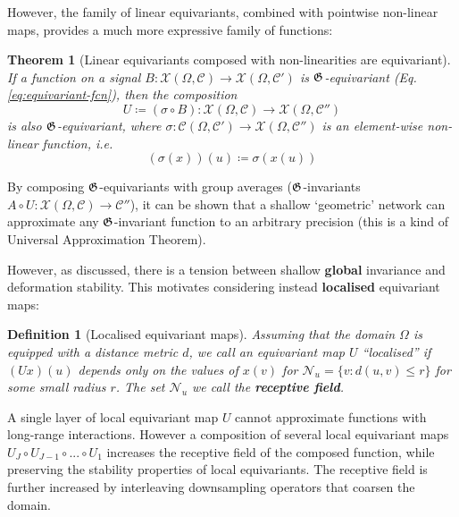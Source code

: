 \documentclass[11pt]{article}
\numberwithin{equation}{section}
\newcommand{\defeq}{\coloneqq}
\newtheorem{thm}{Theorem}[section]
\newtheorem{defn}{Definition}[section]
\begin{document}
However, the family of linear equivariants, combined with pointwise non-linear maps, provides a much more expressive family of functions:
\begin{thm}[Linear equivariants composed with non-linearities are equivariant]
If a function on a signal $B: \mathcal{X}(\Omega, \mathcal{C}) \rightarrow \mathcal{X}(\Omega, \mathcal{C}')$ is $\mathfrak{G}$-equivariant (Eq.\eqref{eq:equivariant-fcn}), then the composition 
\begin{equation}
U \defeq (\sigma \circ B): \mathcal{X}(\Omega, \mathcal{C}) \rightarrow \mathcal{X}(\Omega, \mathcal{C}'')
\end{equation}
is also $\mathfrak{G}$-equivariant, where $\sigma : \mathcal{C}(\Omega, \mathcal{C}') \rightarrow \mathcal{X}(\Omega, \mathcal{C}'')$ is an element-wise non-linear function, i.e. 
\begin{equation}
(\sigma(x))(u) \defeq \sigma(x(u))
\end{equation}
\end{thm}
By composing $\mathfrak{G}$-equivariants with group averages ($\mathfrak{G}$-invariants $A \circ U : \mathcal{X}(\Omega, \mathcal{C})\rightarrow \mathcal{C}''$), it can be shown that a shallow `geometric' network can approximate any $\mathfrak{G}$-invariant function to an arbitrary precision (this is a kind of Universal Approximation Theorem). 

However, as discussed, there is a tension between shallow \textbf{global} invariance and deformation stability. This motivates considering instead \textbf{localised} equivariant maps:
\begin{defn}[Localised equivariant maps]
Assuming that the domain $\Omega$ is equipped with a distance metric $d$, we call an equivariant map $U$ ``localised'' if $(Ux)(u)$ depends only on the values of $x(v)$ for $\mathcal{N}_u = \{v : d(u, v) \leq r\}$ for some small radius $r$. The set $\mathcal{N}_u$ we call the \textbf{receptive field}.
\end{defn}

A single layer of local equivariant map $U$ cannot approximate functions with long-range interactions. However a composition of several local equivariant maps $U_J \circ U_{J-1} \circ ... \circ U_1$ increases the receptive field of the composed function, while preserving the stability properties of local equivariants. The receptive field is further increased by interleaving downsampling operators that coarsen the domain.
\end{document}
